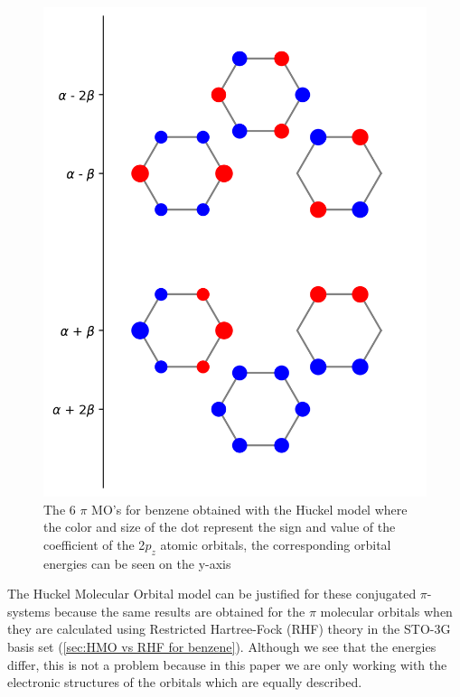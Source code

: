 \documentclass[twoside,twocolumn,9pt]{article}
\begin{document}
  \begin{figure}[h]
  \includegraphics[width=\linewidth]{diagram_huckel_MO's.png}
  \caption{The 6 $\pi$ MO's for benzene obtained with the H$\ddot{\text{u}}$ckel model where the color and size of the dot represent the sign and value of the coefficient of the 2$p_z$ atomic orbitals, the corresponding orbital energies can be seen on the y-axis}
  \label{fig:diagram benzene}
  \end{figure}

  The H$\ddot{\text{u}}$ckel Molecular Orbital model can be justified for these conjugated $\pi$-systems because the same results are obtained for the $\pi$ molecular orbitals when they are calculated using Restricted Hartree-Fock (RHF) theory in the STO-3G basis set (\cref{sec:HMO vs RHF for benzene}). Although we see that the energies differ, this is not a problem because in this paper we are only working with the electronic structures of the orbitals which are equally described.
\end{document}
